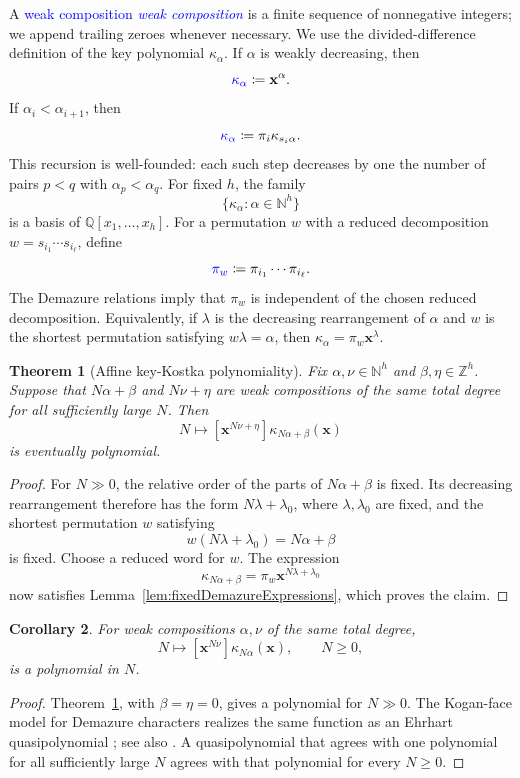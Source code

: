 \documentclass[11pt,reqno]{amsart}
\newtheorem{theorem}{Theorem}[section]
\newtheorem{corollary}[theorem]{Corollary}
\theoremstyle{definition}
\newcommand{\setN}{\mathbb{N}}
\newcommand{\setZ}{\mathbb{Z}}
\newcommand{\xvec}{\mathbf{x}}
\newcommand{\keypoly}{\kappa}
\newcommand{\defin}[1]{%
  \relax\ifmmode%
  \textcolor{blue}{#1}%
  \else\textcolor{blue}{\emph{#1}}%
  \fi%
}
\begin{document}
A \defin{weak composition} is a finite sequence of nonnegative integers; we
append trailing zeroes whenever necessary.  We use the divided-difference
definition of the key polynomial \(\keypoly_\alpha\).  If \(\alpha\) is weakly
decreasing, then
\[
\defin{\keypoly_\alpha}\coloneqq\xvec^\alpha.
\]
If \(\alpha_i<\alpha_{i+1}\), then
\[
\defin{\keypoly_\alpha}\coloneqq\pi_i\keypoly_{s_i\alpha}.
\]
This recursion is well-founded: each such step decreases by one the number of
pairs \(p<q\) with \(\alpha_p<\alpha_q\).
For fixed \(h\), the family
\[
\{\keypoly_\alpha:\alpha\in\setN^h\}
\]
is a basis of \(\mathbb Q[x_1,\dotsc,x_h]\).
For a permutation \(w\) with a reduced decomposition
\(w=s_{i_1}\dotsm s_{i_\ell}\), define
\[
\defin{\pi_w}
\coloneqq
\pi_{i_1}\dotsm\pi_{i_\ell}.
\]
The Demazure relations imply that \(\pi_w\) is independent of the chosen
reduced decomposition.
Equivalently, if \(\lambda\) is the decreasing rearrangement of \(\alpha\)
and \(w\) is the shortest permutation satisfying \(w\lambda=\alpha\), then
\(\keypoly_\alpha=\pi_w\xvec^\lambda\).

\begin{theorem}[Affine key-Kostka polynomiality]
\label{thm:affineKeyKostka}
Fix \(\alpha,\nu\in\setN^h\) and \(\beta,\eta\in\setZ^h\).  Suppose that
\(N\alpha+\beta\) and
\(N\nu+\eta\) are weak compositions of the same total degree for all
sufficiently large \(N\).  Then
\[
N\longmapsto
[\xvec^{N\nu+\eta}]\keypoly_{N\alpha+\beta}(\xvec)
\]
is eventually polynomial.
\end{theorem}

\begin{proof}
For \(N\gg0\), the relative order of the parts of \(N\alpha+\beta\) is fixed.
Its decreasing rearrangement therefore has the form \(N\lambda+\lambda_0\),
where \(\lambda,\lambda_0\) are fixed, and the shortest permutation \(w\) satisfying
\[
w(N\lambda+\lambda_0)=N\alpha+\beta
\]
is fixed.  Choose a reduced word for \(w\).  The expression
\[
\keypoly_{N\alpha+\beta}
=\pi_w\xvec^{N\lambda+\lambda_0}
\]
now satisfies Lemma~\ref{lem:fixedDemazureExpressions}, which proves the
claim.
\end{proof}

\begin{corollary}
\label{cor:pureKeyKostka}
For weak compositions \(\alpha,\nu\) of the same total degree,
\[
N\longmapsto
[\xvec^{N\nu}]\keypoly_{N\alpha}(\xvec),
\qquad N\geq0,
\]
is a polynomial in \(N\).
\end{corollary}

\begin{proof}
Theorem~\ref{thm:affineKeyKostka}, with \(\beta=\eta=0\), gives a polynomial
for \(N\gg0\).  The Kogan-face model for Demazure characters realizes the
same function as an Ehrhart quasipolynomial
\cite{Kogan2005,KiritchenkoSmirnovTimorin2010}; see also
\cite{AlexanderssonAlhajjar2018}.  A quasipolynomial that agrees with one
polynomial for all sufficiently large \(N\) agrees with that polynomial for
every \(N\geq0\).
\end{proof}
\end{document}
